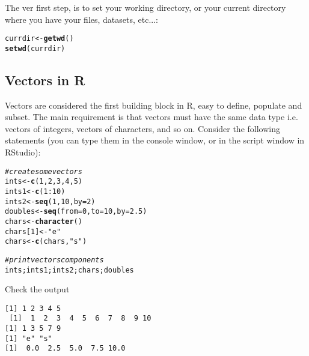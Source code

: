 \documentclass{article}\usepackage[]{graphicx}\usepackage[]{color}
\makeatletter
\newcommand{\hlnum}[1]{\textcolor[rgb]{0.686,0.059,0.569}{#1}}%
\newcommand{\hlstr}[1]{\textcolor[rgb]{0.192,0.494,0.8}{#1}}%
\newcommand{\hlcom}[1]{\textcolor[rgb]{0.678,0.584,0.686}{\textit{#1}}}%
\newcommand{\hlopt}[1]{\textcolor[rgb]{0,0,0}{#1}}%
\newcommand{\hlstd}[1]{\textcolor[rgb]{0.345,0.345,0.345}{#1}}%
\newcommand{\hlkwb}[1]{\textcolor[rgb]{0.69,0.353,0.396}{#1}}%
\newcommand{\hlkwc}[1]{\textcolor[rgb]{0.333,0.667,0.333}{#1}}%
\newcommand{\hlkwd}[1]{\textcolor[rgb]{0.737,0.353,0.396}{\textbf{#1}}}%
\newenvironment{kframe}{%
 \def\at@end@of@kframe{}%
 \ifinner\ifhmode%
  \def\at@end@of@kframe{\end{minipage}}%
  \begin{minipage}{\columnwidth}%
 \fi\fi%
 \def\FrameCommand##1{\hskip\@totalleftmargin \hskip-\fboxsep
 \colorbox{shadecolor}{##1}\hskip-\fboxsep
     \hskip-\linewidth \hskip-\@totalleftmargin \hskip\columnwidth}%
 \MakeFramed {\advance\hsize-\width
   \@totalleftmargin\z@ \linewidth\hsize
   \@setminipage}}%
 {\par\unskip\endMakeFramed%
 \at@end@of@kframe}
\newenvironment{knitrout}{}{} %
\makeatother
\begin{document}
The ver first step, is to set your working directory, or your current directory where you have your files, datasets, etc...: 

\begin{knitrout}
\color{fgcolor}\begin{kframe}
\begin{alltt}
\hlstd{currdir} \hlkwb{<-} \hlkwd{getwd}\hlstd{()}
\hlkwd{setwd}\hlstd{(currdir)}
\end{alltt}
\end{kframe}
\end{knitrout}

\subsection{Vectors in R}
Vectors are considered the first building block in R, easy to define, populate and subset. The main requirement is that vectors must have the same data type i.e. vectors of integers, vectors of characters, and so on. Consider the following statements (you can type them in the console window, or in the script window in RStudio): 


\begin{knitrout}
\color{fgcolor}\begin{kframe}
\begin{alltt}
\hlcom{# create some vectors}
\hlstd{ints} \hlkwb{<-} \hlkwd{c}\hlstd{(}\hlnum{1}\hlstd{,}\hlnum{2}\hlstd{,}\hlnum{3}\hlstd{,}\hlnum{4}\hlstd{,}\hlnum{5}\hlstd{)}
\hlstd{ints1} \hlkwb{<-} \hlkwd{c}\hlstd{(}\hlnum{1}\hlopt{:}\hlnum{10}\hlstd{)}
\hlstd{ints2} \hlkwb{<-} \hlkwd{seq}\hlstd{(}\hlnum{1}\hlstd{,}\hlnum{10}\hlstd{,}\hlkwc{by}\hlstd{=}\hlnum{2}\hlstd{)}
\hlstd{doubles} \hlkwb{<-} \hlkwd{seq}\hlstd{(}\hlkwc{from}\hlstd{=}\hlnum{0}\hlstd{,}\hlkwc{to}\hlstd{=}\hlnum{10}\hlstd{,}\hlkwc{by}\hlstd{=}\hlnum{2.5}\hlstd{)}
\hlstd{chars} \hlkwb{<-} \hlkwd{character}\hlstd{()}
\hlstd{chars[}\hlnum{1}\hlstd{]} \hlkwb{<-} \hlstr{"e"}
\hlstd{chars} \hlkwb{<-} \hlkwd{c}\hlstd{(chars,}\hlstr{"s"}\hlstd{)}

\hlcom{# print vectors components}
\hlstd{ints;ints1;ints2; chars;doubles}
\end{alltt}
\end{kframe}
\end{knitrout}
Check the output
\begin{knitrout}
\color{fgcolor}\begin{kframe}
\begin{verbatim}
[1] 1 2 3 4 5
 [1]  1  2  3  4  5  6  7  8  9 10
[1] 1 3 5 7 9
[1] "e" "s"
[1]  0.0  2.5  5.0  7.5 10.0
\end{verbatim}
\end{kframe}
\end{knitrout}
\end{document}
